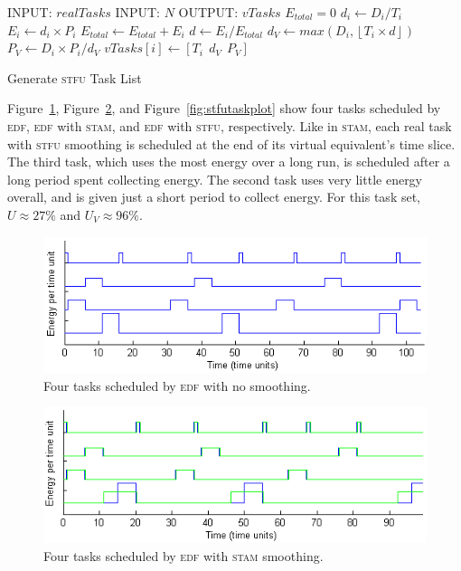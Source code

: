 \begin{algorithm}[htb]
\label{alg:stfualg}
\begin{algorithmic}
\STATE INPUT: $realTasks$  
\STATE INPUT: $N$ 
\STATE OUTPUT: $vTasks$ 
\STATE $E_{total} = 0$
\STATE $d_i \gets D_i / T_i$
\STATE $E_i \gets d_i \times P_i$
\STATE $E_{total} \gets E_{total} +E_i$
\ENDFOR
{}
\STATE $d \gets E_i / E_{total}$
\STATE $d_{V} \gets max(D_i, \left \lfloor T_i \times d \right \rfloor)$
\STATE $P_V \gets D_i \times P_i / d_{V}$
\STATE $vTasks[i] \gets [T_i~~d_{V}~~P_V]$
\ENDFOR
\end{algorithmic}
\caption{Generate \textsc{stfu} Task List}
\end{algorithm}

Figure~\ref{fig:edftasksched}, Figure~\ref{fig:stamtaskplot}, and Figure~\ref{fig:stfutaskplot} show four tasks scheduled by \textsc{edf}, \textsc{edf} with \textsc{stam}, and \textsc{edf} with \textsc{stfu}, respectively.  Like in \textsc{stam}, each real task with \textsc{stfu} smoothing is scheduled at the end of its virtual equivalent's time slice.  The third task, which uses the most energy over a long run, is scheduled after a long period spent collecting energy.  The second task uses very little energy overall, and is given just a short period to collect energy.  For this task set, $U \approx 27\%$ and $U_V \approx 96\%$.


\begin{figure}[tb]
\includegraphics[scale=0.64]{edftasks.png}
\caption{Four tasks scheduled by \textsc{edf} with no smoothing.\label{fig:edftasksched}}
\end{figure}

\begin{figure}[tb]
\includegraphics[scale=0.64]{stamtasks.png}
\caption{Four tasks scheduled by \textsc{edf} with \textsc{stam} smoothing.\label{fig:stamtaskplot}}
\end{figure}


